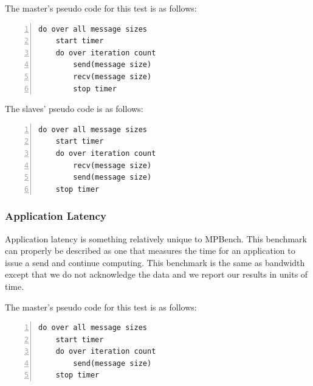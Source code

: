 The master's pseudo code for this test is as follows:

\begin{minipage}{\textwidth}
\end{minipage}

\begin{minipage}{\textwidth}
\begin{lstlisting}[frame=single,numbers=left]
  do over all message sizes 
    start timer
    do over iteration count
        send(message size)
        recv(message size) 
        stop timer
\end{lstlisting}
\end{minipage}

The slaves' pseudo code is as follows:

\begin{minipage}{\textwidth}
\end{minipage}

\begin{minipage}{\textwidth}
\begin{lstlisting}[frame=single,numbers=left]
do over all message sizes 
    start timer
    do over iteration count
        recv(message size)
        send(message size)
    stop timer
\end{lstlisting}
\end{minipage}

\subsubsection{Application Latency}

Application latency is something relatively unique to MPBench. This benchmark
can properly be described as one that measures the time for an application
to issue a send and continue computing. This benchmark is the same as
bandwidth except that we do not acknowledge the data and we report our
results in units of time.

The master's pseudo code for this test is as follows:

\begin{minipage}{\textwidth}
\end{minipage}

\begin{minipage}{\textwidth}
\begin{lstlisting}[frame=single,numbers=left]
do over all message sizes 
    start timer
    do over iteration count 
        send(message size) 
    stop timer
\end{lstlisting}    
\end{minipage}

